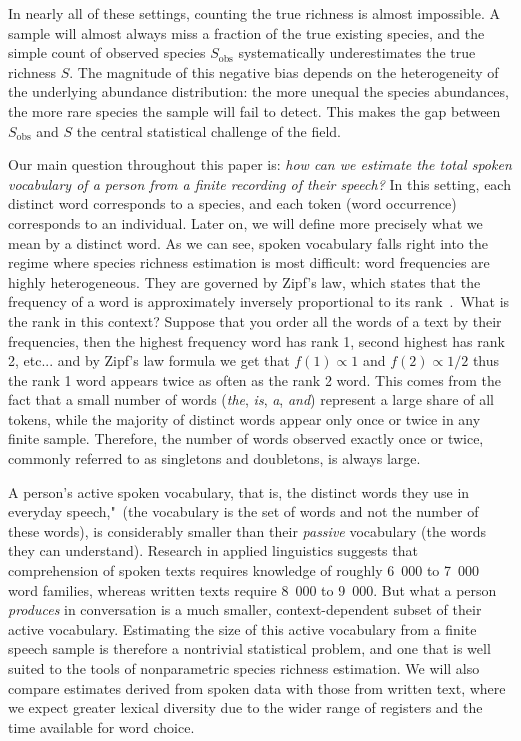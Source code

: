 ﻿\documentclass{article}
\begin{document}
In nearly all of these settings, counting the true richness is almost impossible. A sample will almost always miss a fraction of the true existing species, and the simple count of observed species $S_{\mathrm{obs}}$ systematically underestimates the true richness $S$. The magnitude of this negative bias depends on the heterogeneity of the underlying abundance distribution: the more unequal the species abundances, the more rare species the sample will fail to detect. This makes the gap between $S_{\mathrm{obs}}$ and $S$ the central statistical challenge of the field.

\vspace{1em}

Our main question throughout this paper is: \emph{how can we estimate the total spoken vocabulary of a person from a finite recording of their speech?} In this setting, each distinct word corresponds to a species, and each token (word occurrence) corresponds to an individual. Later on, we will define more precisely what we mean by a distinct word. As we can see, spoken vocabulary falls right into the regime where species richness estimation is most difficult: word frequencies are highly heterogeneous. 
They are governed by Zipf's law, which states that the frequency of a word is approximately inversely proportional to its rank~\cite{baayen2001}.\ What is the rank in this context? Suppose that you order all the words of a text by their frequencies, then the highest frequency word has rank 1, second highest has rank 2, etc... and by Zipf's law formula we get that $f(1)\propto{1}$ and $f(2)\propto{1/2}$ thus the rank 1 word appears twice as often as the rank 2 word.  This comes from the fact that a small number of words (\emph{the}, \emph{is}, \emph{a}, \emph{and}) represent a large share of all tokens, while the majority of distinct words appear only once or twice in any finite sample. Therefore, the number of words observed exactly once or twice, commonly referred to as singletons and doubletons, is always large.

A person’s active spoken vocabulary, that is, the distinct words they use in everyday speech," (the vocabulary is the set of words and not the number of these words), is considerably smaller than their \emph{passive} vocabulary (the words they can understand). Research in applied linguistics suggests that comprehension of spoken texts requires knowledge of roughly 6 \,000 to 7 \,000 word families, whereas written texts require 8 \,000 to 9 \,000. But what a person \emph{produces} in conversation is a much smaller, context-dependent subset of their active vocabulary. Estimating the size of this active vocabulary from a finite speech sample is therefore a nontrivial statistical problem, and one that is well suited to the tools of nonparametric species richness estimation. We will also compare estimates derived from spoken data with those from written text, where we expect greater lexical diversity due to the wider range of registers and the time available for word choice.
\end{document}
